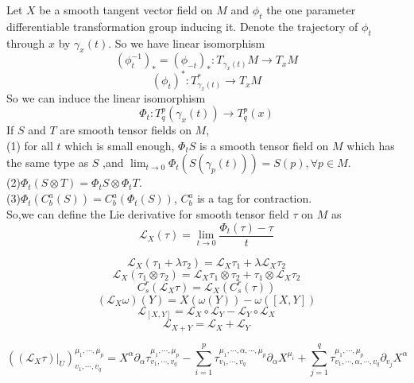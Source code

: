 \begin{newdef}
Let $X$ be a smooth tangent vector field on $M$ and $\phi_t$ the one parameter differentiable transformation group inducing it. Denote the trajectory of $\phi_t$ through $x$ by $\gamma_x(t)$. So we have linear isomorphism
\[(\phi_t^{-1})_{*} = (\phi_{-t})_{*} : T_{\gamma_x(t)}M \to T_xM\]
\[(\phi_t)^* : T_{\gamma_x(t)}^* \to T_xM\]
So we can induce the linear isomorphism
\[\Phi_t: T^p_q(\gamma_x(t)) \to T^p_q(x)\]
If $S$ and $T$ are smooth tensor fields on $M$,\\
(1) for all $t$ which is small enough, $\Phi_tS$ is a smooth tensor field on $M$ which has the same type as $S$ ,and $\lim_{t \to 0} \Phi_t(S(\gamma_p(t))) = S(p),\forall p \in M$.\\
(2)$\Phi_t(S \otimes T) = \Phi_tS \otimes \Phi_tT$.\\
(3)$\Phi_t(C^a_b(S)) = C^a_b(\Phi_t(S))$, $C^a_b$ is a tag for contraction.\\
So,we can define the Lie derivative for smooth tensor field $\tau$ on $M$ as
\[\mathcal{L}_{X}(\tau) = \lim_{t \to 0}\frac{\Phi_t(\tau)-\tau}{t}\]
\end{newdef}

\begin{newprop}
\[\mathcal{L}_X(\tau_1+\lambda \tau_2) = \mathcal{L}_X \tau_1 + \lambda \mathcal{L}_X \tau_2\]
\[\mathcal{L}_X(\tau_1 \otimes \tau_2) = \mathcal{L}_X\tau_1 \otimes \tau_2 + \tau_1 \otimes \mathcal{L}_X \tau_2\]
\[C^r_s(\mathcal{L}_X \tau) = \mathcal{L}_X(C^r_s(\tau))\]
\[(\mathcal{L}_X \omega)(Y) = X(\omega(Y)) - \omega([X,Y])\]
\[\mathcal{L}_{[X,Y]} = \mathcal{L}_X \circ \mathcal{L}_Y - \mathcal{L}_Y \circ \mathcal{L}_X \]
\[\mathcal{L}_{X+Y} = \mathcal{L}_{X} + \mathcal{L}_{Y}\]
\end{newprop}

\begin{newprop}
\[((\mathcal{L}_X \tau)|_U)^{\mu_1,\cdots,\mu_p}_{v_1,\cdots,v_q} = X^{\alpha} \partial_{\alpha} \tau^{\mu_1,\cdots,\mu_p}_{v_1,\cdots,v_q} - \sum_{i=1}^{p} \tau^{\mu_1,\cdots,\alpha,\cdots,\mu_p}_{v_1,\cdots,v_q} \partial_{\alpha} X^{\mu_i} + \sum_{j=1}^{q}\tau^{\mu_1,\cdots,\mu_p}_{v_1,\cdots,\alpha,\cdots,v_q} \partial_{v_j}X^{\alpha}\]
\end{newprop}


